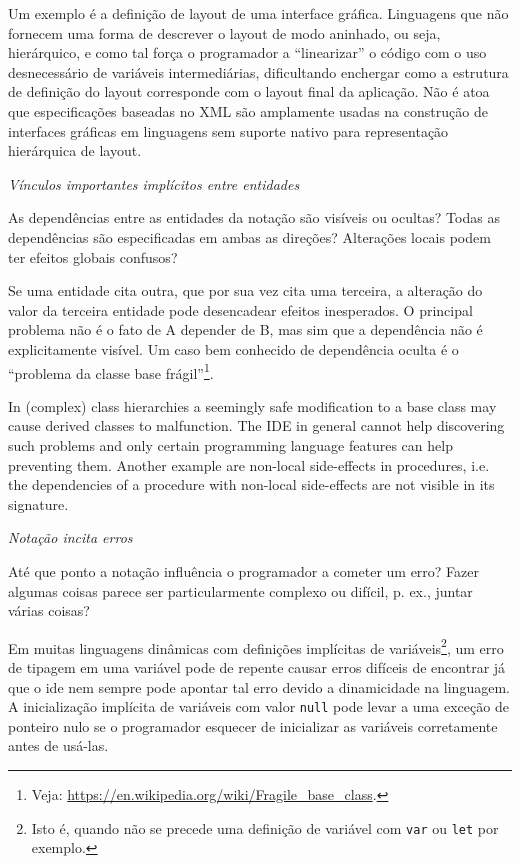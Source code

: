 \begin{description}
\begin{citacao}
  Um exemplo é a definição de layout de uma interface gráfica. Linguagens que
  não fornecem uma forma de descrever o layout de modo aninhado, ou seja,
  hierárquico, e como tal força o programador a “linearizar” o código com o uso
  desnecessário de variáveis intermediárias, dificultando enchergar como a
  estrutura de definição do layout corresponde com o layout final da aplicação.
  Não é atoa que especificações baseadas no XML são amplamente usadas na
  construção de interfaces gráficas em linguagens sem suporte nativo para
  representação hierárquica de layout.
  \cite[p.~13; tradução nossa]{kiss2014}
\end{citacao}

\item[{Dependências ocultas}] \emph{Vínculos importantes implícitos entre entidades}

As dependências entre as entidades da notação são visíveis ou ocultas?
Todas as dependências são especificadas em ambas as direções? Alterações
locais podem ter efeitos globais confusos?

Se uma entidade cita outra, que por sua vez cita uma terceira, a
alteração do valor da terceira entidade pode desencadear efeitos
inesperados. O principal problema não é o fato de A depender de B, mas sim
que a dependência não é explicitamente visível. Um caso bem conhecido de dependência
oculta é o “problema da classe base frágil”\footnote{Veja: \url{https://en.wikipedia.org/wiki/Fragile\_base\_class}.}.

\begin{citacao}
  In (complex) class hierarchies a seemingly safe modification to a base class
  may cause derived classes to malfunction. The IDE in general cannot help
  discovering such problems and only certain programming language features can
  help preventing them. Another example are non-local side-effects in
  procedures, i.e. the dependencies of a procedure with non-local side-effects
  are not visible in its signature.
  \cite[pg.~14]{kiss2014}
\end{citacao}

\item[{Propensão a erros}] \emph{Notação incita erros}

Até que ponto a notação influência o programador a cometer um erro? Fazer
algumas coisas parece ser particularmente complexo ou difícil, p. ex.,
juntar várias coisas?

Em muitas linguagens dinâmicas com definições implícitas de
variáveis\footnote{Isto é, quando não se precede uma definição de variável
com \texttt{var} ou \texttt{let} por exemplo.}, um erro de tipagem em uma variável pode
de repente causar erros difíceis de encontrar já que o \gls{ide} nem sempre
pode apontar tal erro devido a dinamicidade na linguagem. A inicialização
implícita de variáveis com valor \texttt{null} pode levar a uma exceção de
ponteiro nulo se o programador esquecer de inicializar as variáveis
corretamente antes de usá-las.


\end{description}
